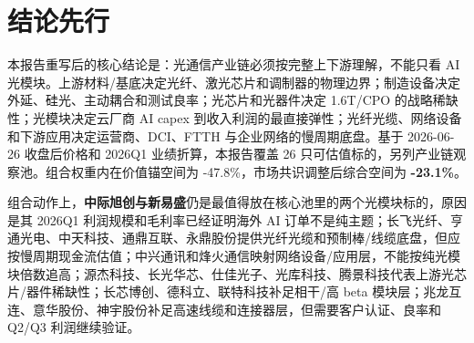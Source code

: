 \section{结论先行}
本报告重写后的核心结论是：光通信产业链必须按完整上下游理解，不能只看 AI 光模块。上游材料/基底决定光纤、激光芯片和调制器的物理边界；制造设备决定外延、硅光、主动耦合和测试良率；光芯片和光器件决定 1.6T/CPO 的战略稀缺性；光模块决定云厂商 AI capex 到收入利润的最直接弹性；光纤光缆、网络设备和下游应用决定运营商、DCI、FTTH 与企业网络的慢周期底盘。基于 2026-06-26 收盘后价格和 2026Q1 业绩折算，本报告覆盖 26 只可估值标的，另列产业链观察池。组合权重内在价值锚空间为 -47.8\%，市场共识调整后综合空间为 \textbf{-23.1\%}。

组合动作上，\textbf{中际旭创与新易盛}仍是最值得放在核心池里的两个光模块标的，原因是其 2026Q1 利润规模和毛利率已经证明海外 AI 订单不是纯主题；长飞光纤、亨通光电、中天科技、通鼎互联、永鼎股份提供光纤光缆和预制棒/线缆底盘，但应按慢周期现金流估值；中兴通讯和烽火通信映射网络设备/应用层，不能按纯光模块倍数追高；源杰科技、长光华芯、仕佳光子、光库科技、腾景科技代表上游光芯片/器件稀缺性；长芯博创、德科立、联特科技补足相干/高 beta 模块层；兆龙互连、意华股份、神宇股份补足高速线缆和连接器层，但需要客户认证、良率和 Q2/Q3 利润继续验证。


